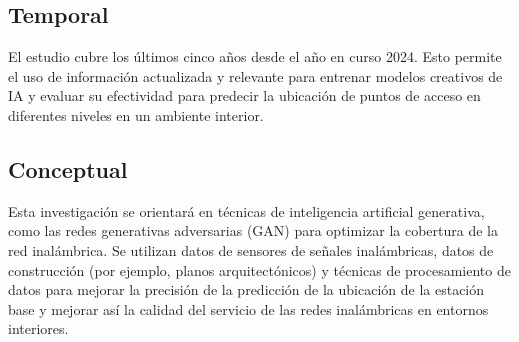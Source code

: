 \subsection{Temporal}
El estudio cubre los últimos cinco años desde el año en curso 2024. Esto permite el uso de información actualizada y relevante para entrenar modelos creativos de IA y evaluar su efectividad para predecir la ubicación de puntos de acceso en diferentes niveles en un ambiente interior.

\subsection{Conceptual}
Esta investigación se orientará en técnicas de inteligencia artificial generativa, como las redes generativas adversarias (GAN) para optimizar la cobertura de la red inalámbrica. Se utilizan datos de sensores de señales inalámbricas, datos de construcción (por ejemplo, planos arquitectónicos) y técnicas de procesamiento de datos para mejorar la precisión de la predicción de la ubicación de la estación base y mejorar así la calidad del servicio de las redes inalámbricas en entornos interiores.
